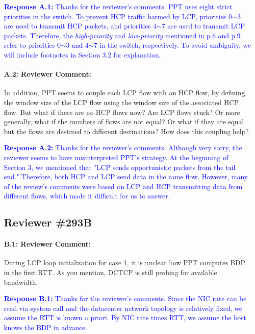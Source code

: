 \documentclass[12pt,one-column]{article}
\begin{document}
\noindent\textcolor{blue}{\textbf{Response A.1:}
Thanks for the reviewer’s comments. 
PPT uses eight strict priorities in the switch.
To prevent HCP traffic harmed by LCP, priorities 0$\sim$3 are used to transmit HCP packets, and priorities 4$\sim$7 are used to transmit LCP packets.
Therefore, the \emph{high-priority} and \emph{low-priority} mentioned in p.6 and p.9 refer to priorities 0$\sim$3 and 4$\sim$7 in the switch, respectively.
To avoid ambiguity, we will include footnotes in Section 3.2 for explanation.
}


{\it \paragraph{A.2: Reviewer Comment:} In addition, PPT seems to couple each LCP flow with an HCP flow, by defining the window size of the LCP flow using the window size of the associated HCP flow. But what if there are no HCP flows now? Are LCP flows stuck? Or more generally, what if the numbers of flows are not equal? Or what if they are equal but the flows are destined to different destinations? How does this coupling help? }	

\noindent\textcolor{blue}{\textbf{Response A.2:}
Thanks for the reviewer's comments. 
Although very sorry, the reviewer seems to have misinterpreted PPT's strategy.
At the beginning of Section 3, we mentioned that "LCP sends opportunistic packets from the tail end."
Therefore, both HCP and LCP send data in the same flow.
However, many of the review's comments were based on LCP and HCP transmitting data from different flows, which made it difficult for us to answer.
}

\subsection{Reviewer \#293B}
{\it \paragraph{B.1: Reviewer Comment:} During LCP loop initialization for case 1, it is unclear how PPT computes BDP in the first RTT. As you mention, DCTCP is still probing for available bandwidth.}

\noindent\textcolor{blue}{\textbf{Response B.1:}
Thanks for the reviewer’s comments. 
Since the NIC rate can be read via system call and the datacenter network topology is relatively fixed, we assume the RTT is known a priori.
By NIC rate times RTT, we assume the host knows the BDP in advance.
}
\end{document}
